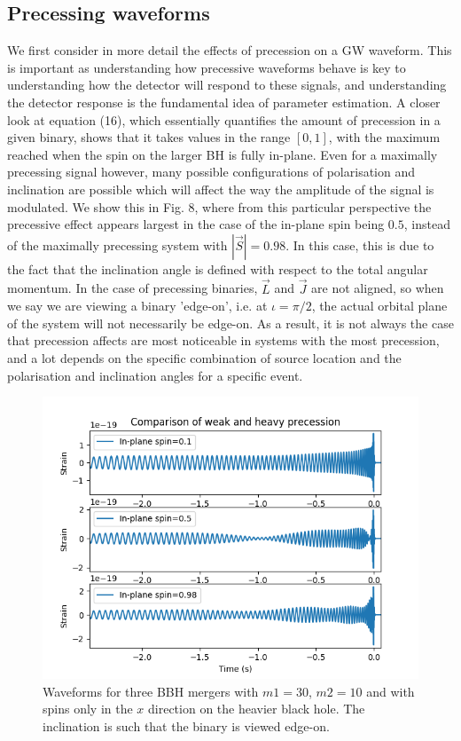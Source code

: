 \documentclass[11pt]{article}
\begin{document}
\subsection{Precessing waveforms}
We first consider in more detail the effects of precession on a GW waveform. This is important as understanding how precessive waveforms behave is key to understanding how the detector will respond to these signals, and understanding the detector response is the fundamental idea of parameter estimation. A closer look at equation (16), which essentially quantifies the amount of precession in a given binary, shows that it takes values in the range $[0,1]$, with the maximum reached when the spin on the larger BH is fully in-plane. Even for a maximally precessing signal however, many possible configurations of polarisation and inclination are possible which will affect the way the amplitude of the signal is modulated. We show this in Fig. 8, where from this particular perspective the precessive effect appears largest in the case of the in-plane spin being $0.5$, instead of the maximally precessing system with $|\vec{S}|=0.98$. In this case, this is due to the fact that the inclination angle is defined with respect to the total angular momentum. In the case of precessing binaries, $\vec{L}$ and $\vec{J}$ are not aligned, so when we say we are viewing a binary 'edge-on', i.e. at $\iota=\pi/2$, the actual orbital plane of the system will not necessarily be edge-on. As a result, it is not always the case that precession affects are most noticeable in systems with the most precession, and a lot depends on the specific combination of source location and the polarisation and inclination angles for a specific event.
\begin{figure}[h]
	\includegraphics[scale=1]{fig8.png}
	\centering
	\caption{Waveforms for three BBH mergers with $m1=30$, $m2=10$ and with spins only in the $x$ direction on the heavier black hole. The inclination is such that the binary is viewed edge-on.}
	\centering
\end{figure}
\end{document}
